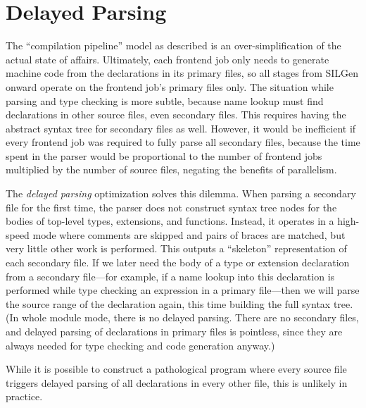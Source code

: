 \documentclass[../generics]{subfiles}
\begin{document}
\section{Delayed Parsing}\label{delayed parsing}

The ``compilation pipeline'' model as described is an over-simplification of the actual state of affairs. Ultimately, each frontend job only needs to generate machine code from the declarations in its primary files, so all stages from SILGen onward operate on the frontend job's primary files only. The situation while parsing and type checking is more subtle, because name lookup must find declarations in other source files, even secondary files. This requires having the abstract syntax tree for secondary files as well. However, it would be inefficient if every frontend job was required to fully parse all secondary files, because the time spent in the parser would be proportional to the number of frontend jobs multiplied by the number of source files, negating the benefits of parallelism.

The \emph{delayed parsing} optimization solves this dilemma. When parsing a secondary file for the first time, the parser does not construct syntax tree nodes for the bodies of top-level types, extensions, and functions. Instead, it operates in a high-speed mode where comments are skipped and pairs of braces are matched, but very little other work is performed. This outputs a ``skeleton'' representation of each secondary file. If we later need the body of a type or extension declaration from a secondary file---for example, if a name lookup into this declaration is performed while type checking an expression in a primary file---then we will parse the source range of the declaration again, this time building the full syntax tree. (In whole module mode, there is no delayed parsing. There are no secondary files, and delayed parsing of declarations in primary files is pointless, since they are always needed for type checking and code generation anyway.)

While it is possible to construct a pathological program where every source file triggers delayed parsing of all declarations in every other file, this is unlikely in practice.
\end{document}
